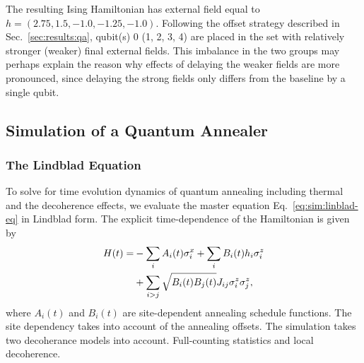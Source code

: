 \documentclass[10pt]{iopart}
\begin{document}
The resulting Ising Hamiltonian has external field equal to $h = (2.75, 1.5, -1.0, -1.25, -1.0)$.
Following the offset strategy described in Sec.~\ref{sec:results:qa}, qubit(s) 0 (1, 2, 3, 4) are placed in the set with relatively stronger (weaker) final external fields.
This imbalance in the two groups may perhaps explain the reason why effects of delaying the weaker fields are more pronounced, since delaying the strong fields only differs from the baseline by a single qubit.



\subsection{Simulation of a Quantum Annealer}
\label{sec:methods:simulation}

\subsubsection{The Lindblad Equation}
\label{sec:methods:lindblad}

To solve for time evolution dynamics of quantum annealing including thermal and the decoherence effects, we evaluate the master equation Eq.~\eqref{eq:sim:linblad-eq} in Lindblad form.
The explicit time-dependence of the Hamiltonian is given by
\begin{align}
 \label{eq:annealH}
 H(t)  = & - \sum_i  A_i(t)\sigma^x_i +\sum_i B_{i}(t) h_i \sigma^z_i \notag \\
 & + \sum_{i>j} \sqrt{B_{i}(t)B_{j}(t)} J_{ij} \sigma^z_i \sigma^z_j  ,
\end{align}
where $A_i(t)$ and $B_{i}(t)$ are site-dependent annealing schedule functions.
The site dependency takes into account of the annealing offsets.
The simulation takes two decoherance models into account.
Full-counting statistics and local decoherence.
\end{document}
